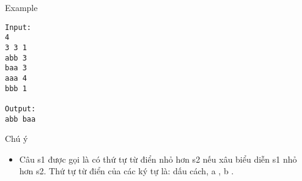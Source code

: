 Example
\begin{verbatim}
Input:
4
3 3 1
abb 3
baa 3
aaa 4
bbb 1

Output:
abb baa
\end{verbatim}
Chú ý
 
\begin{itemize}
	\item Câu s1 được gọi là có thứ tự từ điển nhỏ hơn s2 nếu xâu biểu diễn s1 nhỏ hơn s2. Thứ tự từ điển của các ký tự là: dấu cách, a , b .
\end{itemize}